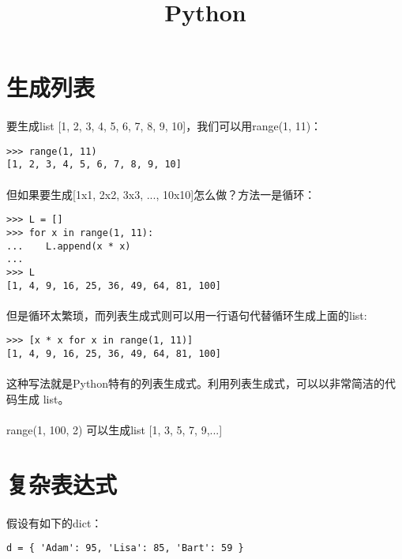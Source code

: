 \documentclass{article}
\begin{document}
\begin{CJK}{UTF8}{gbsn}
\title{Python}
\date{}
\maketitle
\section{生成列表}
\paragraph{}
要生成list [1, 2, 3, 4, 5, 6, 7, 8, 9, 10]，我们可以用range(1, 11)：
\begin{verbatim}
>>> range(1, 11)
[1, 2, 3, 4, 5, 6, 7, 8, 9, 10]
\end{verbatim}
\paragraph{}
但如果要生成[1x1, 2x2, 3x3, ..., 10x10]怎么做？方法一是循环：
\begin{verbatim}
>>> L = []
>>> for x in range(1, 11):
...    L.append(x * x)
... 
>>> L
[1, 4, 9, 16, 25, 36, 49, 64, 81, 100]
\end{verbatim}
\paragraph{}
但是循环太繁琐，而列表生成式则可以用一行语句代替循环生成上面的list:
\begin{verbatim}
>>> [x * x for x in range(1, 11)]
[1, 4, 9, 16, 25, 36, 49, 64, 81, 100]
\end{verbatim}
\paragraph{}
这种写法就是Python特有的列表生成式。利用列表生成式，可以以非常简洁的代码生成 list。
\paragraph{}
range(1, 100, 2) 可以生成list [1, 3, 5, 7, 9,...]
\section{复杂表达式}
\paragraph{}
假设有如下的dict：
\begin{verbatim}
d = { 'Adam': 95, 'Lisa': 85, 'Bart': 59 }
\end{verbatim}

\end{CJK}
\end{document}
